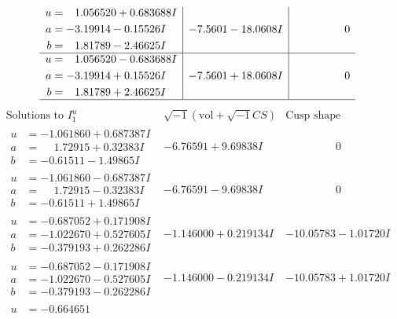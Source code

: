 \documentclass[1p]{elsarticle_modified}
\theoremstyle{definition}
\newcommand{\I}{\sqrt{-1}}
\begin{document}
$$\begin{array}{c|c|c}
\begin{aligned}
u &= \phantom{-}1.056520 + 0.683688 I \\
a &= -3.19914 - 0.15526 I \\
b &= \phantom{-}1.81789 - 2.46625 I\end{aligned}
 & -7.5601 - 18.0608 I & \phantom{-0.000000 } 0 \\ \hline\begin{aligned}
u &= \phantom{-}1.056520 - 0.683688 I \\
a &= -3.19914 + 0.15526 I \\
b &= \phantom{-}1.81789 + 2.46625 I\end{aligned}
 & -7.5601 + 18.0608 I & \phantom{-0.000000 } 0\\
 \hline 
 \end{array}$$\newpage$$\begin{array}{c|c|c}  
\text{Solutions to }I^u_{1}& \I (\text{vol} + \sqrt{-1}CS) & \text{Cusp shape}\\
 \hline 
\begin{aligned}
u &= -1.061860 + 0.687387 I \\
a &= \phantom{-}1.72915 + 0.32383 I \\
b &= -0.61511 - 1.49865 I\end{aligned}
 & -6.76591 + 9.69838 I & \phantom{-0.000000 } 0 \\ \hline\begin{aligned}
u &= -1.061860 - 0.687387 I \\
a &= \phantom{-}1.72915 - 0.32383 I \\
b &= -0.61511 + 1.49865 I\end{aligned}
 & -6.76591 - 9.69838 I & \phantom{-0.000000 } 0 \\ \hline\begin{aligned}
u &= -0.687052 + 0.171908 I \\
a &= -1.022670 + 0.527605 I \\
b &= -0.379193 + 0.262286 I\end{aligned}
 & -1.146000 + 0.219134 I & -10.05783 - 1.01720 I \\ \hline\begin{aligned}
u &= -0.687052 - 0.171908 I \\
a &= -1.022670 - 0.527605 I \\
b &= -0.379193 - 0.262286 I\end{aligned}
 & -1.146000 - 0.219134 I & -10.05783 + 1.01720 I \\ \hline\begin{aligned}
u &= -0.664651\phantom{ +0.000000I} \\

\end{aligned}
\end{array}$$
\end{document}
